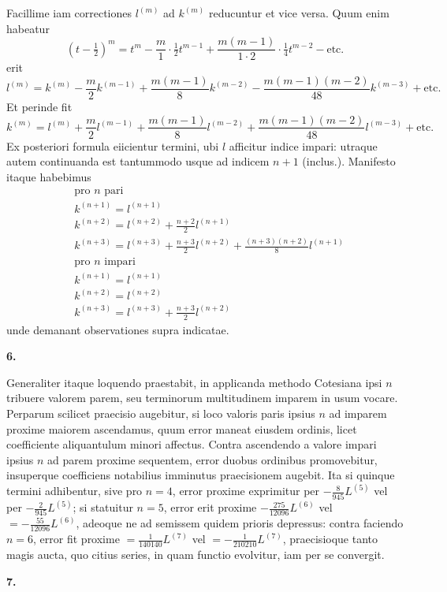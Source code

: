 \documentclass[12pt,a4paper]{article}
\newcommand{\art}[1]{\par\medskip\noindent\textbf{#1.}\par\nopagebreak\smallskip}
\begin{document}
Facillime iam correctiones $l^{(m)}$ ad $k^{(m)}$ reducuntur et vice versa. Quum enim habeatur
\[
(t-\tfrac{1}{2})^m = t^m - \frac{m}{1}\cdot\tfrac{1}{2}t^{m-1} + \frac{m(m-1)}{1\cdot2}\cdot\tfrac{1}{4}t^{m-2} - \text{etc.}
\]
erit
\[
l^{(m)} = k^{(m)} - \frac{m}{2}k^{(m-1)} + \frac{m(m-1)}{8}k^{(m-2)} - \frac{m(m-1)(m-2)}{48}k^{(m-3)} + \text{etc.}
\]
Et perinde fit
\[
k^{(m)} = l^{(m)} + \frac{m}{2}l^{(m-1)} + \frac{m(m-1)}{8}l^{(m-2)} + \frac{m(m-1)(m-2)}{48}l^{(m-3)} + \text{etc.}
\]
Ex posteriori formula eiicientur termini, ubi $l$ afficitur indice impari: utraque autem continuanda est tantummodo usque ad indicem $n+1$ (inclus.). Manifesto itaque habebimus
\begin{align*}
&\text{pro }n\text{ pari}\\
&k^{(n+1)} = l^{(n+1)}\\
&k^{(n+2)} = l^{(n+2)} + \frac{n+2}{2}l^{(n+1)}\\
&k^{(n+3)} = l^{(n+3)} + \frac{n+3}{2}l^{(n+2)} + \frac{(n+3)(n+2)}{8}l^{(n+1)}\\
&\text{pro }n\text{ impari}\\
&k^{(n+1)} = l^{(n+1)}\\
&k^{(n+2)} = l^{(n+2)}\\
&k^{(n+3)} = l^{(n+3)} + \frac{n+3}{2}l^{(n+2)}
\end{align*}
unde demanant observationes supra indicatae.

\art{6}

Generaliter itaque loquendo praestabit, in applicanda methodo Cotesiana ipsi $n$ tribuere valorem parem, seu terminorum multitudinem imparem in usum vocare. Perparum scilicet praecisio augebitur, si loco valoris paris ipsius $n$ ad imparem proxime maiorem ascendamus, quum error maneat eiusdem ordinis, licet coefficiente aliquantulum minori affectus. Contra ascendendo a valore impari ipsius $n$ ad parem proxime sequentem, error duobus ordinibus promovebitur, insuperque coefficiens notabilius imminutus praecisionem augebit. Ita si quinque termini adhibentur, sive pro $n=4$, error proxime exprimitur per $-\frac{8}{945}L^{(5)}$ vel per $-\frac{2}{945}L^{(5)}$; si statuitur $n=5$, error erit proxime $-\frac{275}{12096}L^{(6)}$ vel $=-\frac{55}{12096}L^{(6)}$, adeoque ne ad semissem quidem prioris depressus: contra faciendo $n=6$, error fit proxime $=\frac{1}{140140}L^{(7)}$ vel $=-\frac{1}{210210}L^{(7)}$, praecisioque tanto magis aucta, quo citius series, in quam functio evolvitur, iam per se convergit.

\art{7}
\end{document}
